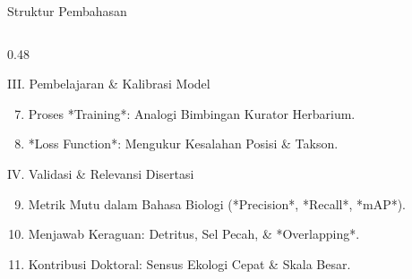 \documentclass[aspectratio=169, 10pt]{beamer}
\begin{document}
\begin{frame}{Struktur Pembahasan}
\begin{columns}[T]
        \begin{column}{0.48\textwidth}
            \begin{conceptcard}{III. Pembelajaran \& Kalibrasi Model}
                \scriptsize
                \begin{enumerate}\setcounter{enumi}{6}\setlength\itemsep{4pt}
                    \item Proses *Training*: Analogi Bimbingan Kurator Herbarium.
                    \item *Loss Function*: Mengukur Kesalahan Posisi \& Takson.
                \end{enumerate}
            \end{conceptcard}
            \vspace{3pt}
            \begin{alertcard}{IV. Validasi \& Relevansi Disertasi}
                \scriptsize
                \begin{enumerate}\setcounter{enumi}{8}\setlength\itemsep{4pt}
                    \item Metrik Mutu dalam Bahasa Biologi (*Precision*, *Recall*, *mAP*).
                    \item Menjawab Keraguan: Detritus, Sel Pecah, \& *Overlapping*.
                    \item Kontribusi Doktoral: Sensus Ekologi Cepat \& Skala Besar.
                \end{enumerate}
            \end{alertcard}
        \end{column}
    \end{columns}
\end{frame}

\end{document}
